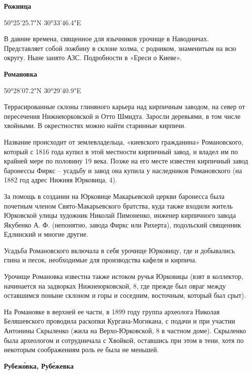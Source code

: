 \medskip

\textbf{Рожница} 

50°25'25.7"N 30°33'46.4"E

В давние времена, священное для язычников урочище в Наводничах. Представляет собой ложбину в склоне холма, с родником, знаменитым на всю округу. Ныне занято АЗС. Подробности в «Ереси о Киеве».\\

\medskip

\textbf{Романовка} 

50°28'07.2"N 30°29'40.9"E

Террасированные склоны глиняного карьера над кирпичным заводом, на север от пересечения Нижнеюрковской и Отто Шмидта. Заросли деревьями, в том числе хвойными. В окрестностях можно найти старинные кирпичи.

Название происходит от землевладельца, «киевского гражданина» Романовского, который с 1816 года купил в этой местности кирпичный завод, и владел им по крайней мере по половину 19 века. Позже на его месте известен кирпичный завод баронессы Фиркс – усадьбу и завод она купила у наследников Романовского (на 1882 год адрес Нижняя Юрковица, 4).

За помощь в создании на Юрковице Макарьевской церкви баронесса была почетным членом Свято-Макарьевского братства, куда также входили житель Юрковской улицы художник Николай Пимоненко, инженер кирпичного завода Якубенко А. Ф. (непонятно, завода Фиркс или Рихерта), подольский священник Едлинский и многие другие.

Усадьба Романовского включала в себя урочище Юрковицу, где и добывались глина и песок, необходимые для производства кафеля и кирпича.

Урочище Романовка известна также истоком ручья Юрковицы (взят в коллектор, начинается на задворках Нижнеюрковской, 8, где прежде был овраг между оставшимся поныне склоном и горы и соседним, восточным, который был срыт).

На Романовке в верхней ее части, в 1899 году группа археолога Николая Беляшевского   проводила раскопки Кургана-Могикана, с подачи и при участии Антонины Скрыленко (жила на Верхо-Юрковской, 8 в частном доме). Скрыленко была археологом и сотрудничала с Хвойкой, оставшись при этом в тени, хотя по некоторым соображениям роль ее была не меньшей.\\

\medskip
  
\textbf{Рубеж\'овка, Руб\'ежевка} 

